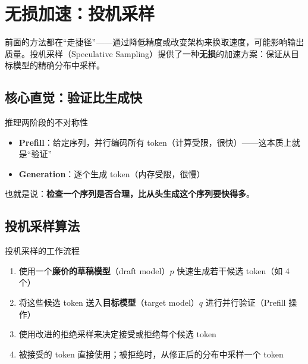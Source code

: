 \section{无损加速：投机采样}

前面的方法都在``走捷径''——通过降低精度或改变架构来换取速度，可能影响输出质量。投机采样（Speculative Sampling）提供了一种\textbf{无损}的加速方案：保证从目标模型的精确分布中采样。

\subsection{核心直觉：验证比生成快}

\begin{importantbox}{推理两阶段的不对称性}
\begin{itemize}
    \item \textbf{Prefill}：给定序列，并行编码所有 token（计算受限，很快）——这本质上就是``验证''
    \item \textbf{Generation}：逐个生成 token（内存受限，很慢）
\end{itemize}
也就是说：\textbf{检查一个序列是否合理，比从头生成这个序列要快得多}。
\end{importantbox}

\subsection{投机采样算法}

\begin{importantbox}{投机采样的工作流程}
\begin{enumerate}
    \item 使用一个\textbf{廉价的草稿模型}（draft model）$p$ 快速生成若干候选 token（如 4 个）
    \item 将这些候选 token 送入\textbf{目标模型}（target model）$q$ 进行并行验证（Prefill 操作）
    \item 使用改进的拒绝采样来决定接受或拒绝每个候选 token
    \item 被接受的 token 直接使用；被拒绝时，从修正后的分布中采样一个 token
\end{enumerate}
\end{importantbox}

